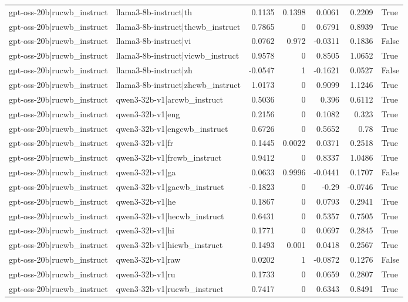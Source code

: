 \begin{table}
\begin{tabular}{l l r r r r l}
gpt-oss-20b|rucwb_instruct & llama3-8b-instruct|th & 0.1135 & 0.1398 & 0.0061 & 0.2209 & True \\
gpt-oss-20b|rucwb_instruct & llama3-8b-instruct|thcwb_instruct & 0.7865 & 0 & 0.6791 & 0.8939 & True \\
gpt-oss-20b|rucwb_instruct & llama3-8b-instruct|vi & 0.0762 & 0.972 & -0.0311 & 0.1836 & False \\
gpt-oss-20b|rucwb_instruct & llama3-8b-instruct|vicwb_instruct & 0.9578 & 0 & 0.8505 & 1.0652 & True \\
gpt-oss-20b|rucwb_instruct & llama3-8b-instruct|zh & -0.0547 & 1 & -0.1621 & 0.0527 & False \\
gpt-oss-20b|rucwb_instruct & llama3-8b-instruct|zhcwb_instruct & 1.0173 & 0 & 0.9099 & 1.1246 & True \\
gpt-oss-20b|rucwb_instruct & qwen3-32b-v1|arcwb_instruct & 0.5036 & 0 & 0.396 & 0.6112 & True \\
gpt-oss-20b|rucwb_instruct & qwen3-32b-v1|eng & 0.2156 & 0 & 0.1082 & 0.323 & True \\
gpt-oss-20b|rucwb_instruct & qwen3-32b-v1|engcwb_instruct & 0.6726 & 0 & 0.5652 & 0.78 & True \\
gpt-oss-20b|rucwb_instruct & qwen3-32b-v1|fr & 0.1445 & 0.0022 & 0.0371 & 0.2518 & True \\
gpt-oss-20b|rucwb_instruct & qwen3-32b-v1|frcwb_instruct & 0.9412 & 0 & 0.8337 & 1.0486 & True \\
gpt-oss-20b|rucwb_instruct & qwen3-32b-v1|ga & 0.0633 & 0.9996 & -0.0441 & 0.1707 & False \\
gpt-oss-20b|rucwb_instruct & qwen3-32b-v1|gacwb_instruct & -0.1823 & 0 & -0.29 & -0.0746 & True \\
gpt-oss-20b|rucwb_instruct & qwen3-32b-v1|he & 0.1867 & 0 & 0.0793 & 0.2941 & True \\
gpt-oss-20b|rucwb_instruct & qwen3-32b-v1|hecwb_instruct & 0.6431 & 0 & 0.5357 & 0.7505 & True \\
gpt-oss-20b|rucwb_instruct & qwen3-32b-v1|hi & 0.1771 & 0 & 0.0697 & 0.2845 & True \\
gpt-oss-20b|rucwb_instruct & qwen3-32b-v1|hicwb_instruct & 0.1493 & 0.001 & 0.0418 & 0.2567 & True \\
gpt-oss-20b|rucwb_instruct & qwen3-32b-v1|raw & 0.0202 & 1 & -0.0872 & 0.1276 & False \\
gpt-oss-20b|rucwb_instruct & qwen3-32b-v1|ru & 0.1733 & 0 & 0.0659 & 0.2807 & True \\
gpt-oss-20b|rucwb_instruct & qwen3-32b-v1|rucwb_instruct & 0.7417 & 0 & 0.6343 & 0.8491 & True \\

\end{tabular}
\end{table}
